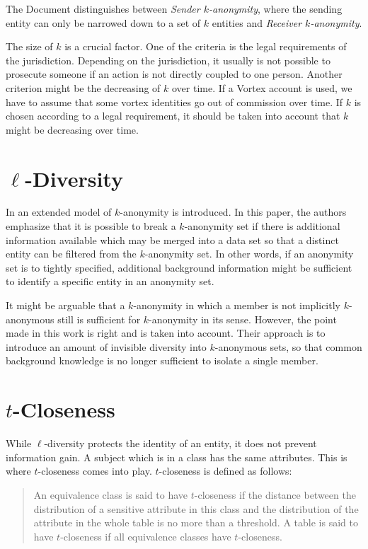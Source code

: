 The Document distinguishes between \textit{Sender $k$-anonymity}, where the sending entity can only be narrowed down to a set of $k$ entities and \textit{Receiver $k$-anonymity}. 

The size of $k$ is a crucial factor. One of the criteria is the legal requirements of the jurisdiction. Depending on the jurisdiction, it usually is not possible to prosecute someone if an action is not directly coupled to one person. Another criterion might be the decreasing of $k$ over time. If a Vortex account is used, we have to assume that some vortex identities go out of commission over time. If $k$ is chosen according to a legal requirement, it should be taken into account that $k$ might be decreasing over time.

\section{\texorpdfstring{$\ell$}{l}-Diversity}
In \cite{machanavajjhala2007diversity} an extended model of $k$-anonymity is introduced. In this paper, the authors emphasize that it is possible to break a $k$-anonymity set if there is additional information available which may be merged into a data set so that a distinct entity can be filtered from the $k$-anonymity set. In other words, if an anonymity set is to tightly specified, additional background information might be sufficient to identify a specific entity in an anonymity set.

It might be arguable that a $k$-anonymity in which a member is not implicitly $k$-anonymous still is sufficient for $k$-anonymity in its sense. However, the point made in this work is right and is taken into account. Their approach is to introduce an amount of invisible diversity into $k$-anonymous sets, so that common background knowledge is no longer sufficient to isolate a single member.

\section{\texorpdfstring{$t$}{t}-Closeness}
While $\ell$-diversity protects the identity of an entity, it does not prevent information gain. A subject which is in a class has the same attributes. This is where $t$-closeness\cite{li2007t} comes into play. $t$-closeness is defined as follows:

\begin{quote}
	An equivalence class is said to have $t$-closeness if the distance between the distribution of a sensitive attribute in this class and the distribution of the attribute in the whole table is no more than a threshold. A table is said to have $t$-closeness if all equivalence classes have $t$-closeness.
\end{quote}

